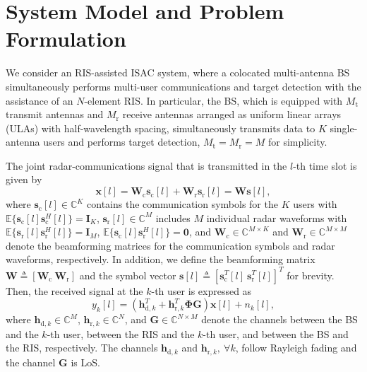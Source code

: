 \documentclass[Conference,a4paper]{IEEEtran}
\newcommand{\be}{\begin{equation}}
\newcommand{\ee}{\end{equation}}
\begin{document}
\section{System Model and Problem Formulation}


We consider an RIS-assisted ISAC system, where a colocated multi-antenna BS simultaneously performs multi-user communications and target detection with the assistance of an $N$-element RIS.
In particular, the BS, which is equipped with $M_\text{t}$ transmit antennas and $M_\text{r}$ receive antennas arranged as uniform linear arrays (ULAs) with half-wavelength spacing, simultaneously transmits data to $K$ single-antenna users and performs target detection, $M_\text{t}=M_\text{r}=M$ for simplicity.



The joint radar-communications signal that is transmitted in the $l$-th time slot is given by \cite{Liu-TSP-2020}
\be
\mathbf{x}[l] = \mathbf{W}_\text{c}\mathbf{s}_\text{c}[l] + \mathbf{W}_\text{r}\mathbf{s}_\text{r}[l]  = \mathbf{W}\mathbf{s}[l],
\ee
where $\mathbf{s}_\text{c}[l] \in\mathbb{C}^K$ contains the communication symbols for the $K$ users with $\mathbb{E}\{\mathbf{s}_\text{c}[l]\mathbf{s}_\text{c}^H[l]\}=\mathbf{I}_K$, $\mathbf{s}_\text{r}[l] \in\mathbb{C}^M$ includes $M$ individual radar waveforms with $\mathbb{E}\{\mathbf{s}_\text{r}[l]\mathbf{s}_\text{r}^H[l]\}=\mathbf{I}_M$, $\mathbb{E}\{\mathbf{s}_\text{c}[l]\mathbf{s}_\text{r}^H[l]\}=\mathbf{0}$, and  $\mathbf{W}_\text{c}\in\mathbb{C}^{M\times K}$ and $\mathbf{W}_\text{r}\in\mathbb{C}^{M\times M}$ denote the beamforming matrices for the  communication symbols and radar waveforms, respectively.
In addition, we define the beamforming matrix $\mathbf{W} \triangleq [\mathbf{W}_\text{c}~\mathbf{W}_\text{r}]$ and the symbol vector $\mathbf{s}[l]  \triangleq [\mathbf{s}_\text{c}^T[l] ~\mathbf{s}_\text{r}^T[l] ]^T$ for brevity.
Then, the received signal at the $k$-th user is expressed as
\be
y_k[l]  = (\mathbf{h}_{\text{d},k}^T + \mathbf{h}_{\text{r},k}^T\bm{\Phi}\mathbf{G})\mathbf{x}[l] + n_k[l],
\ee
where $\mathbf{h}_{\text{d},k}\in\mathbb{C}^M$, $\mathbf{h}_{\text{r},k}\in\mathbb{C}^N$, and $\mathbf{G}\in\mathbb{C}^{N\times M}$ denote the channels between the BS and the $k$-th user, between the RIS and the $k$-th user, and between the BS and the RIS, respectively.
The channels $\mathbf{h}_{\text{d},k}$ and $\mathbf{h}_{\text{r},k},~\forall k$, follow Rayleigh fading and the channel $\mathbf{G}$ is LoS.
\end{document}
